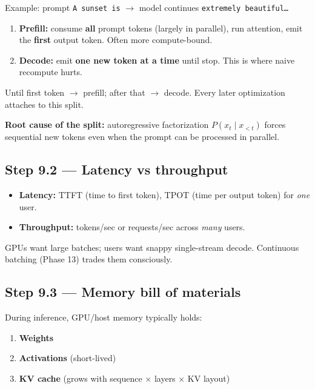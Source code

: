 \documentclass[11pt,a4paper]{article}
\begin{document}
Example: prompt \texttt{A sunset is} $\rightarrow$ model continues \texttt{extremely beautiful\ldots{}}


\begin{enumerate}
\item \textbf{Prefill:} consume \textbf{all} prompt tokens (largely in parallel), run attention, emit the \textbf{first} output token. Often more compute-bound.  
\item \textbf{Decode:} emit \textbf{one new token at a time} until stop. This is where naive recompute hurts.
\end{enumerate}


Until first token $\rightarrow$ prefill; after that $\rightarrow$ decode. Every later optimization attaches to this split.


\textbf{Root cause of the split:} autoregressive factorization \(P(x_t\mid x_{<t})\) forces sequential new tokens even when the prompt can be processed in parallel.


\subsection{Step 9.2 --- Latency vs throughput}


\begin{itemize}
\item \textbf{Latency:} TTFT (time to first token), TPOT (time per output token) for \textit{one} user.  
\item \textbf{Throughput:} tokens/sec or requests/sec across \textit{many} users.
\end{itemize}


GPUs want large batches; users want snappy single-stream decode. Continuous batching (Phase 13) trades them consciously.


\subsection{Step 9.3 --- Memory bill of materials}


During inference, GPU/host memory typically holds:

\begin{enumerate}
\item \textbf{Weights}  
\item \textbf{Activations} (short-lived)  
\item \textbf{KV cache} (grows with sequence $\times$ layers $\times$ KV layout)
\end{enumerate}
\end{document}
